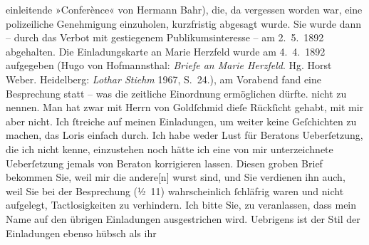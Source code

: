 \begin{ledgroupsized}[t]{13cm}
{{{                  einleitende »Conferènce« von Hermann Bahr),
                  die, da vergessen worden war, eine polizeiliche Genehmigung einzuholen,
                  kurzfristig abgesagt wurde. Sie wurde dann – durch das Verbot mit gestiegenem
                  Publikumsinteresse – am 2. 5. 1892 abgehalten. Die Einladungskarte an
                     Marie Herzfeld wurde am
                     4. 4. 1892 aufgegeben (Hugo von Hofmannsthal: \emph{Briefe an Marie Herzfeld}. Hg. Horst Weber. Heidelberg:
                        \emph{Lothar Stiehm}{ }1967, S. 24.), am Vorabend fand eine Besprechung statt –
                  was die zeitliche Einordnung ermöglichen dürfte.}}}\label{K_L00092-1h} nicht zu nennen. Man hat
               zwar mit Herrn von Goldſchmid dieſe Rückſicht
               gehabt, mit mir aber nicht. Ich ſtreiche auf meinen Einladungen, um weiter keine
               Geſchichten zu machen, das Loris einfach durch. Ich habe {\pb}weder Lust für Beratons Ueberſetzung, die ich nicht
               kenne, einzustehen noch hätte ich eine von mir unterzeichnete Ueberſetzung jemals von
                  Beraton korrigieren lassen. Diesen groben
               Brief bekommen Sie, weil mir die andere{[}n{]} wurst sind, und Sie
               verdienen ihn auch, weil Sie bei der Besprechung (½ 11) wahrscheinlich
               ſchläfrig waren und nicht aufgelegt, Tactlosigkeiten zu verhindern.\pend
           \pstart
           Ich bitte Sie, zu veranlassen, dass mein Name auf den übrigen Einladungen
               ausgestrichen wird. Uebrigens ist der Stil der Einladungen ebenso hübsch als ihr

\end{ledgroupsized}
